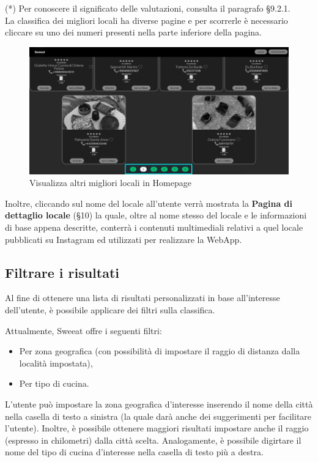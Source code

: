 (*) Per conoscere il significato delle valutazioni, consulta il paragrafo \S{9.2.1}. \\

La classifica dei migliori locali ha diverse pagine e per scorrerle è necessario cliccare su uno dei numeri presenti nella parte inferiore della pagina.

\begin{figure}[H]
\centering
\includegraphics[scale=0.15]{./images/Homepage/Pagine.png} 
\caption{Visualizza altri migliori locali in Homepage}
\end{figure}

Inoltre, cliccando sul nome del locale all’utente verrà mostrata la \textbf{Pagina di dettaglio locale} (\S{10}) la quale, oltre al nome stesso del locale e le informazioni di base appena descritte, conterrà i contenuti multimediali relativi a quel locale pubblicati su Instagram ed utilizzati per realizzare la WebApp.

\subsection{Filtrare i risultati}

Al fine di ottenere una lista di risultati personalizzati in base all’interesse dell’utente, è possibile applicare dei filtri sulla classifica.

Attualmente, Sweeat offre i seguenti filtri:

\begin{itemize}
\item Per zona geografica (con possibilità di impostare il raggio di distanza dalla località impostata),
\item Per tipo di cucina.
\end{itemize}

L’utente può impostare la zona geografica d’interesse inserendo il nome della città nella casella di testo a sinistra (la quale darà anche dei suggerimenti per facilitare l'utente). Inoltre, è possibile ottenere maggiori risultati impostare anche il raggio (espresso in chilometri) dalla città scelta. Analogamente, è possibile digirtare il nome del tipo di cucina d’interesse nella casella di testo più a destra.

